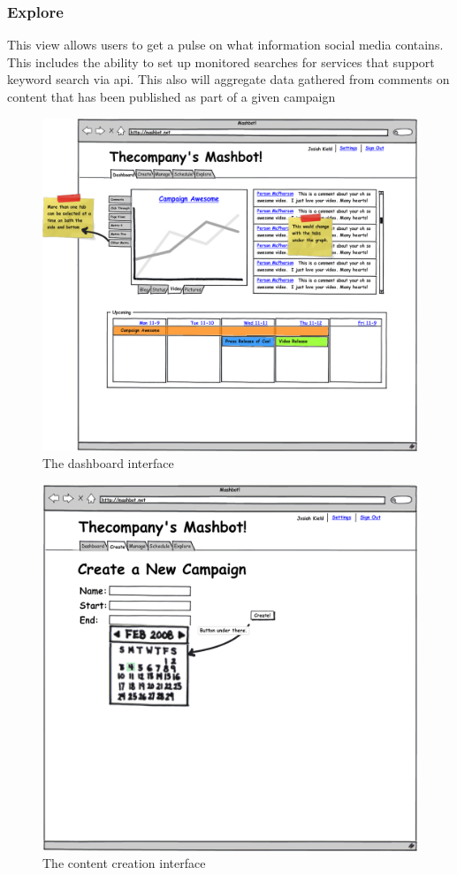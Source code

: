 \documentclass{article}
\begin{document}
\subsubsection{Explore}
This view allows users to get a pulse on what information social media
contains.  This includes the ability to set up monitored searches for
services that support keyword search via api.  This also will
aggregate data gathered from comments on content that has been
published as part of a given campaign
\clearpage
\begin{figure}
\centering
\includegraphics[scale=0.35]{../mockups/dashboard.png}
\caption{The dashboard interface}
\label{dashboard}
\end{figure}
\clearpage
\begin{figure}
\centering
\includegraphics[scale=0.35]{../mockups/create.png}
\caption{The content creation interface}
\label{create}
\end{figure}
\end{document}
